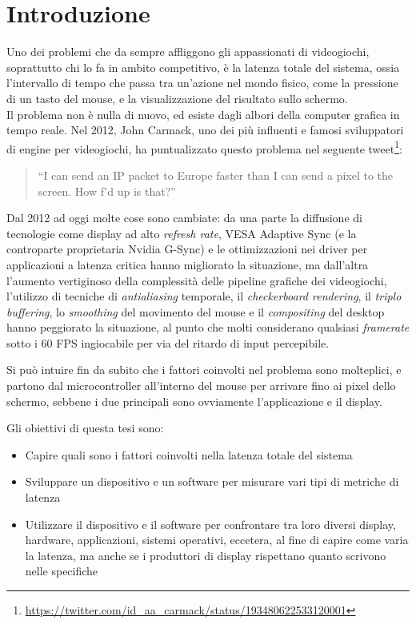 \chapter{Introduzione}
\label{chap:intro}

Uno dei problemi che da sempre affliggono gli appassionati di videogiochi, soprattutto chi lo fa in ambito competitivo, è la latenza totale del sistema, ossia l'intervallo di tempo che passa tra un'azione nel mondo fisico, come la pressione di un tasto del mouse, e la visualizzazione del risultato sullo schermo.\\
Il problema non è nulla di nuovo, ed esiste dagli albori della computer grafica in tempo reale. Nel 2012, John Carmack, uno dei più influenti e famosi sviluppatori di engine per videogiochi, ha puntualizzato questo problema nel seguente tweet\footnote{\url{https://twitter.com/id_aa_carmack/status/193480622533120001}}:
\begin{quotation}
	``I can send an IP packet to Europe faster than I can send a pixel to the screen.  How f’d up is that?''
\end{quotation}
Dal 2012 ad oggi molte cose sono cambiate: da una parte la diffusione di tecnologie come display ad alto \textit{refresh rate}, VESA Adaptive Sync (e la controparte proprietaria Nvidia G-Sync) e le ottimizzazioni nei driver per applicazioni a latenza critica hanno migliorato la situazione, ma dall'altra l'aumento vertiginoso della complessità delle pipeline grafiche dei videogiochi, l'utilizzo di tecniche di \textit{antialiasing} temporale, il \textit{checkerboard rendering}, il \textit{triplo buffering}, lo \textit{smoothing} del movimento del mouse e il \textit{compositing} del desktop hanno peggiorato la situazione, al punto che molti considerano qualsiasi \textit{framerate} sotto i 60 FPS ingiocabile per via del ritardo di input percepibile.

Si può intuire fin da subito che i fattori coinvolti nel problema sono molteplici, e partono dal microcontroller all'interno del mouse per arrivare fino ai pixel dello schermo, sebbene i due principali sono ovviamente l'applicazione e il display.

Gli obiettivi di questa tesi sono:
\begin{itemize}
	\item Capire quali sono i fattori coinvolti nella latenza totale del sistema
	\item Sviluppare un dispositivo e un software per misurare vari tipi di metriche di latenza
	\item Utilizzare il dispositivo e il software per confrontare tra loro diversi display, hardware, applicazioni, sistemi operativi, eccetera, al fine di capire come varia la latenza, ma anche se i produttori di display rispettano quanto scrivono nelle specifiche
\end{itemize} 

